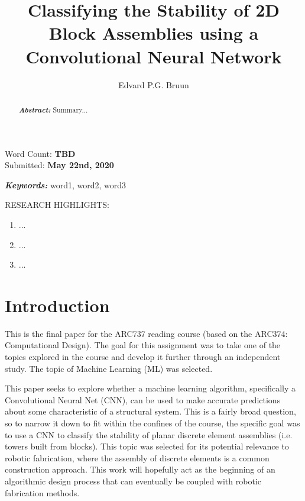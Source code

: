 \documentclass[final,3p]{CSP}
\begin{document}
	
	Word Count: \textbf{TBD}\\
	Submitted: \textbf{May 22nd, 2020}
	
	\begin{frontmatter}
		
		\title{Classifying the Stability of 2D Block Assemblies using a Convolutional Neural Network}
		
		\author{Edvard P.G. Bruun}
		
		
		\begin{keyword}\rm
			\begin{adjustwidth}{2cm}{2cm}{\itshape\textbf{Keywords:}}
				word1, word2, word3
			\end{adjustwidth}
		\end{keyword}
		
		\begin{abstract}\rm
			\begin{adjustwidth}{2cm}{2cm}{\itshape\textbf{Abstract:}} 
				Summary...
			\end{adjustwidth}
		\end{abstract}
	\end{frontmatter}
	
	RESEARCH HIGHLIGHTS:
	\begin{enumerate}
		\item ...
		\item ...
		\item ...
	\end{enumerate}

	
	\clearpage
	\setcounter{page}{1}
	\newpage
	\section{Introduction}
		This is the final paper for the ARC737 reading course (based on the ARC374: Computational Design). The goal for this assignment was to take one of the topics explored in the course and develop it further through an independent study. The topic of Machine Learning (ML) was selected. 
		
		This paper seeks to explore whether  a machine learning algorithm, specifically a Convolutional Neural Net (CNN), can be used to make accurate predictions about some characteristic of a structural system. This is a fairly broad question, so to narrow it down to fit within the confines of the course, the specific goal was to use a CNN to classify the stability of planar discrete element assemblies (i.e. towers built from blocks). This topic was selected for its potential relevance to robotic fabrication, where the assembly of discrete elements is a common construction approach. This work will hopefully act as the beginning of an algorithmic design process that can eventually be coupled with robotic fabrication methods. 
		
\end{document}
